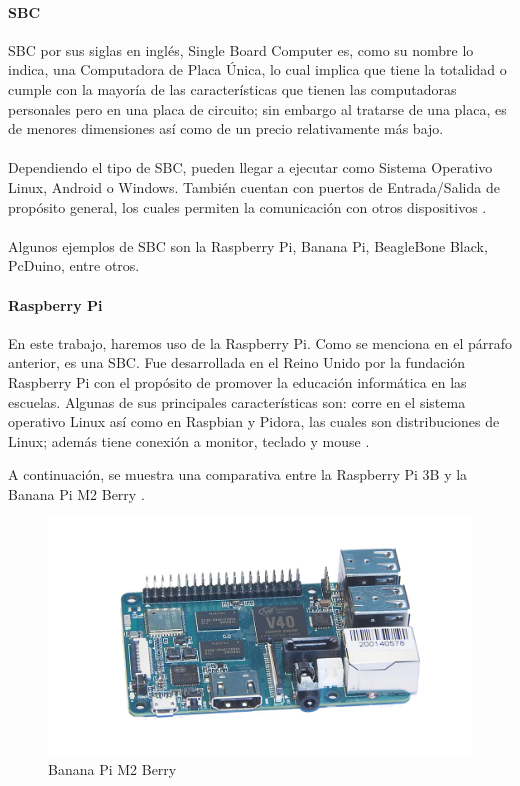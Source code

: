 \paragraph{SBC}
SBC por sus siglas en inglés, Single Board Computer es, como su nombre lo indica, una Computadora de Placa Única, lo cual implica que tiene la totalidad o cumple con la mayoría de las características que tienen las computadoras personales pero en una placa de circuito; sin embargo al tratarse de una placa, es de menores dimensiones así como de un precio relativamente más bajo.
\paragraph{}
Dependiendo el tipo de SBC, pueden llegar a ejecutar como Sistema Operativo Linux, Android o Windows. También cuentan con puertos de Entrada/Salida de propósito general, los cuales permiten la comunicación con otros dispositivos \citep{MarcoTeorico18}. 
\paragraph{}
Algunos ejemplos de SBC son la Raspberry Pi, Banana Pi, BeagleBone Black, PcDuino, entre otros.
\paragraph{Raspberry Pi}
En este trabajo, haremos uso de la Raspberry Pi. Como se menciona en el párrafo anterior, es una SBC. Fue desarrollada en el Reino Unido por la fundación Raspberry Pi con el propósito de promover la educación informática en las escuelas. Algunas de sus principales características son: corre en el sistema operativo Linux así como en Raspbian y Pidora, las cuales son distribuciones de Linux; además tiene conexión a monitor, teclado y mouse \citep{MarcoTeorico19}.   

A continuación, se muestra una comparativa entre la Raspberry Pi 3B y la Banana Pi M2 Berry \citep{MarcoTeorico21}\citep{MarcoTeorico22}.

\begin{figure}[H]
	\centering
	\includegraphics[scale=.3]{Capitulo2/images/bananaPi.png}
	\caption{Banana Pi M2 Berry}
	\label{fig:}
\end{figure}

